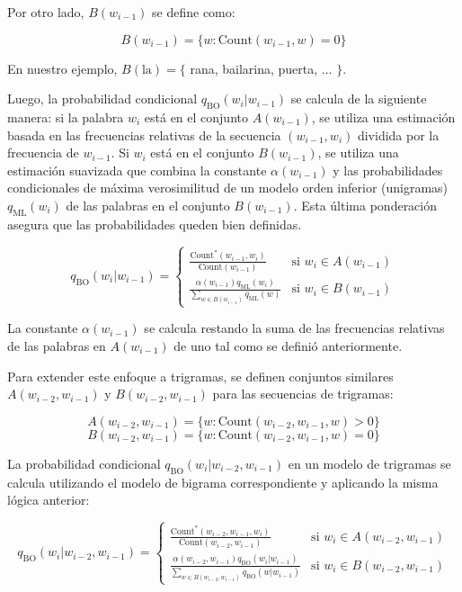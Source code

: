 Por otro lado, $B(w_{i-1})$ se define como:

\[
B(w_{i-1}) = \{w : \text{Count}(w_{i-1}, w) = 0\}
\]

En nuestro ejemplo, $B(\text{la}) = \{$ rana, bailarina, puerta, $\dots$ $\}$.

Luego, la probabilidad condicional $q_{\text{BO}}(w_i | w_{i-1})$ se calcula de la siguiente manera: si la palabra $w_i$ está en el conjunto $A(w_{i-1})$, se utiliza una estimación basada en las frecuencias relativas de la secuencia $(w_{i-1}, w_i)$ dividida por la frecuencia de $w_{i-1}$. Si $w_i$ está en el conjunto $B(w_{i-1})$, se utiliza una estimación suavizada que combina la constante $\alpha(w_{i-1})$ y las probabilidades condicionales de máxima verosimilitud  de un modelo orden inferior (unigramas) $q_{\text{ML}}(w_i)$ de las palabras en el conjunto $B(w_{i-1})$. Esta última ponderación asegura que las probabilidades queden bien definidas.

\[
q_{\text{BO}}(w_i | w_{i-1}) =
\begin{cases}
    \frac{\text{Count}^*(w_{i-1}, w_i)}{\text{Count}(w_{i-1})} & \text{si } w_i \in A(w_{i-1}) \\
    \frac{\alpha(w_{i-1}) q_{\text{ML}}(w_i)}{\sum_{w \in B(w_{i-1})} q_{\text{ML}}(w)} & \text{si } w_i \in B(w_{i-1})
\end{cases}
\]

La constante $\alpha(w_{i-1})$ se calcula restando la suma de las frecuencias relativas de las palabras en $A(w_{i-1})$ de uno tal como se definió anteriormente.



Para extender este enfoque a trigramas, se definen conjuntos similares $A(w_{i-2}, w_{i-1})$ y $B(w_{i-2}, w_{i-1})$ para las secuencias de trigramas:

\[
A(w_{i-2}, w_{i-1}) = \{w : \text{Count}(w_{i-2}, w_{i-1}, w) > 0\}
\]
\[
B(w_{i-2}, w_{i-1}) = \{w : \text{Count}(w_{i-2}, w_{i-1}, w) = 0\}
\]

La probabilidad condicional $q_{\text{BO}}(w_i | w_{i-2}, w_{i-1})$ en un modelo de trigramas se calcula utilizando el modelo de bigrama correspondiente y aplicando la misma lógica anterior:

\[
q_{\text{BO}}(w_i | w_{i-2}, w_{i-1}) =
\begin{cases}
    \frac{\text{Count}^*(w_{i-2}, w_{i-1}, w_i)}{\text{Count}(w_{i-2}, w_{i-1})} & \text{si } w_i \in A(w_{i-2}, w_{i-1}) \\
    \frac{\alpha(w_{i-2}, w_{i-1}) q_{\text{BO}}(w_i|w_{i-1})}{\sum_{w \in B(w_{i-2}, w_{i-1})} q_{\text{BO}}(w|w_{i-1})} & \text{si } w_i \in B(w_{i-2}, w_{i-1})
\end{cases}
\]


